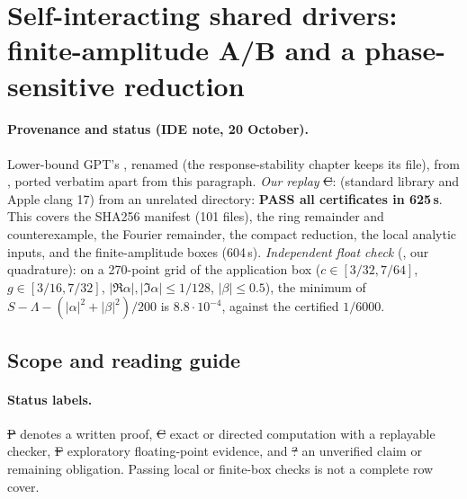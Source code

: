 \section{Self-interacting shared drivers: finite-amplitude A/B and a phase-sensitive reduction}
\label{ch:self-interacting-ab}

\paragraph{Provenance and status (IDE note, 20 October).} Lower-bound GPT's , renamed 
(the response-stability chapter keeps its file), from , ported verbatim apart from this paragraph. \emph{Our replay} \st{C}:
 (standard library and Apple clang 17) from an unrelated directory: \textbf{PASS all certificates in 625\,s}. This covers the SHA256 manifest (101 files),
the ring remainder and counterexample, the Fourier remainder, the compact reduction, the local analytic inputs, and the finite-amplitude boxes (604\,s). \emph{Independent float check}
(, our quadrature): on a 270-point grid of the application box ($c\in[3/32,7/64]$, $g\in[3/16,7/32]$, $|\Re\alpha|,|\Im\alpha|\le1/128$,
$|\beta|\le0.5$), the minimum of $S-\Lambda-(|\alpha|^2+|\beta|^2)/200$ is $8.8\cdot10^{-4}$, against the certified $1/6000$.

\subsection{Scope and reading guide}
\paragraph{Status labels.} \st{P} denotes a written proof, \st{C} exact or directed computation with a replayable checker, \st{F} exploratory floating-point evidence, and \st{?} an unverified claim or remaining obligation. Passing local or finite-box checks is not a complete row cover.

